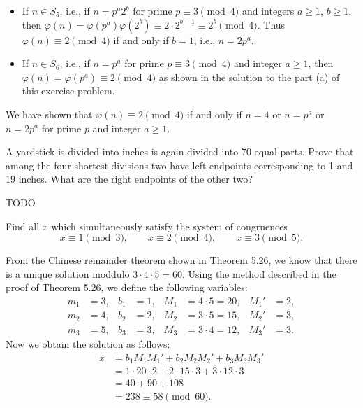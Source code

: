 \begin{solution}
\begin{itemize}
  \item
    If \( n \in S_5 \), i.e., if \( n = p^a 2^b \) for prime \( p
    \equiv 3 \pmod{4} \) and integers \( a \ge 1 \), \( b \ge 1 \),
    then \( \varphi(n) = \varphi(p^a) \varphi(2^b) \equiv 2 \cdot 2^{b
      - 1} \equiv 2^b \pmod{4} \). Thus \( \varphi(n) \equiv 2
    \pmod{4} \) if and only if \( b = 1 \), i.e., \( n = 2p^a \).
  \item
    If \( n \in S_6 \), i.e., if \( n = p^a \) for prime \( p \equiv 3
    \pmod{4} \) and integer \( a \ge 1 \), then \( \varphi(n) =
    \varphi(p^a) \equiv 2 \pmod{4} \) as shown in the solution to the
    part (a) of this exercise problem.
  \end{itemize}
  We have shown that \( \varphi(n) \equiv 2 \pmod{4} \) if and only if
  \( n = 4 \) or \( n = p^a \) or \( n = 2p^a \) for prime \( p \) and
  integer \( a \ge 1 \).
\end{solution}


\begin{exercise}{5.5}
  A yardstick is divided into inches is again divided into 70 equal
  parts. Prove that among the four shortest divisions two have left
  endpoints corresponding to 1 and 19 inches. What are the right
  endpoints of the other two?
\end{exercise}

\begin{solution}
  TODO
\end{solution}


\begin{exercise}{5.6}
  Find all \( x \) which simultaneously satisfy the system of congruences
  \[
    x \equiv 1 \pmod{3}, \qquad
    x \equiv 2 \pmod{4}, \qquad
    x \equiv 3 \pmod{5}.
  \]
\end{exercise}

\begin{solution}
  From the Chinese remainder theorem shown in Theorem 5.26, we know
  that there is a unique solution moddulo \( 3 \cdot 4 \cdot 5 = 60
  \). Using the method described in the proof of Theorem 5.26, we
  define the following variables:
  \begin{align*}
    m_1 & = 3, & b_1 & = 1, & M_1 & = 4 \cdot 5 = 20, & M_1' & = 2, \\
    m_2 & = 4, & b_2 & = 2, & M_2 & = 3 \cdot 5 = 15, & M_2' & = 3, \\
    m_3 & = 5, & b_3 & = 3, & M_3 & = 3 \cdot 4 = 12, & M_3' & = 3.
  \end{align*}
  Now we obtain the solution as follows:
  \begin{align*}
    x & = b_1 M_1 M_1' + b_2 M_2 M_2' + b_3 M_3 M_3' \\
    & = 1 \cdot 20 \cdot 2 + 2 \cdot 15 \cdot 3 + 3 \cdot 12 \cdot 3 \\
    & = 40 + 90 + 108 \\
    & = 238 \equiv 58 \pmod{60}.
  \end{align*}
\end{solution}


